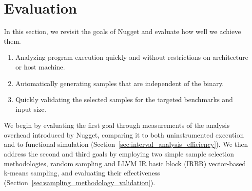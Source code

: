 \section{Evaluation}\label{sec:evaluation}

In this section, we revisit the goals of Nugget and evaluate how well we achieve them.

\begin{enumerate}
    \item Analyzing program execution quickly and without restrictions on architecture or host machine.
    \item Automatically generating samples that are independent of the binary.
    \item Quickly validating the selected samples for the targeted benchmarks and input size.
\end{enumerate}

We begin by evaluating the first goal through measurements of the analysis overhead introduced by Nugget, comparing it to both uninstrumented execution and to functional simulation (Section~\ref{sec:interval_analysis_efficiency}). 
We then address the second and third goals by employing two simple sample selection methodologies, random sampling and LLVM IR basic block (IRBB) vector-based k-means sampling, and evaluating their effectiveness (Section~\ref{sec:sampling_methodology_validation}).

